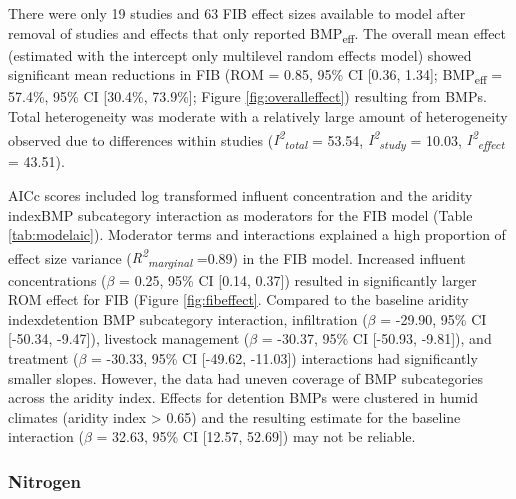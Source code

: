 \documentclass[utf8]{FrontiersinHarvard}
\begin{document}
There were only 19 studies and 63 FIB effect sizes available to model after removal of studies and effects that only reported BMP\textsubscript{eff}.
The overall mean effect (estimated with the intercept only multilevel random effects model) showed significant mean reductions in FIB (ROM = 0.85, 95\% CI {[}0.36, 1.34{]}; BMP\textsubscript{eff} = 57.4\%, 95\% CI {[}30.4\%, 73.9\%{]}; Figure \ref{fig:overalleffect}) resulting from BMPs.
Total heterogeneity was moderate with a relatively large amount of heterogeneity observed due to differences within studies (\textit{I\textsuperscript{2}\textsubscript{total}} = 53.54, \textit{I\textsuperscript{2}\textsubscript{study}} = 10.03, \textit{I\textsuperscript{2}\textsubscript{effect}} = 43.51).

AICc scores included log transformed influent concentration and the aridity index\texttimes BMP subcategory interaction as moderators for the FIB model (Table \ref{tab:modelaic}).
Moderator terms and interactions explained a high proportion of effect size variance (\textit{R\textsuperscript{2}\textsubscript{marginal}} =0.89) in the FIB model.
Increased influent concentrations (\(\beta\) = 0.25, 95\% CI {[}0.14, 0.37{]}) resulted in significantly larger ROM effect for FIB (Figure \ref{fig:fibeffect}.
Compared to the baseline aridity index\texttimes detention BMP subcategory interaction, infiltration (\(\beta\) = -29.90, 95\% CI {[}-50.34, -9.47{]}), livestock management (\(\beta\) = -30.37, 95\% CI {[}-50.93, -9.81{]}), and treatment (\(\beta\) = -30.33, 95\% CI {[}-49.62, -11.03{]}) interactions had significantly smaller slopes.
However, the data had uneven coverage of BMP subcategories across the aridity index.
Effects for detention BMPs were clustered in humid climates (aridity index \textgreater{} 0.65) and the resulting estimate for the baseline interaction (\(\beta\) = 32.63, 95\% CI {[}12.57, 52.69{]}) may not be reliable.

\hypertarget{nitrogen}{%
\subsubsection{Nitrogen}\label{nitrogen}}
\end{document}
